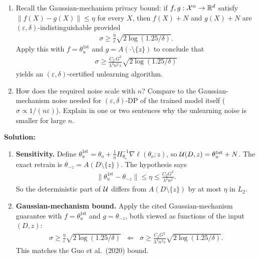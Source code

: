 \documentclass[12pt]{article}
\begin{document}
\begin{enumerate}
\begin{enumerate}
    \item Recall the Gaussian-mechanism privacy bound: if $f, g : {\cal X}^n \to \mathbb{R}^d$ satisfy $\|f(X) - g(X)\| \le \eta$ for every $X$, then $f(X) + N$ and $g(X) + N$ are $(\varepsilon, \delta)$-indistinguishable provided
    \begin{align*}
        \sigma \ge \frac{\eta}{\varepsilon}\sqrt{2\log(1.25/\delta)}.
    \end{align*}
    Apply this with $f = \theta_u^{\mathrm{1st}}$ and $g = A(\cdot \setminus \{z\})$ to conclude that
    \begin{align*}
        \sigma \ge \frac{C_2\, G^2}{\lambda^2 n^2\, \varepsilon}\sqrt{2\log(1.25/\delta)}
    \end{align*}
    yields an $(\varepsilon, \delta)$-certified unlearning algorithm.

    \item How does the required noise scale with $n$? Compare to the Gaussian-mechanism noise needed for $(\varepsilon, \delta)$-DP of the trained model itself ($\sigma \propto 1/(n\varepsilon)$). Explain in one or two sentences why the unlearning noise is smaller for large $n$.
\end{enumerate}

\begin{solution}
{\bf Solution:}\\
\begin{enumerate}
    \item \textbf{Sensitivity.} Define $\theta_u^{\mathrm{1st}} = \theta_o + \frac{1}{n}H_{\theta_o}^{-1}\nabla\ell(\theta_o; z)$, so ${\cal U}(D, z) = \theta_u^{\mathrm{1st}} + N$. The exact retrain is $\theta_{-z} = A(D \setminus \{z\})$. The hypothesis says
    \begin{align*}
        \|\theta_u^{\mathrm{1st}} - \theta_{-z}\| \le \eta \le \frac{C_2 G^2}{\lambda^2 n^2}.
    \end{align*}
    So the deterministic part of ${\cal U}$ differs from $A(D \setminus \{z\})$ by at most $\eta$ in $L_2$.

    \item \textbf{Gaussian-mechanism bound.} Apply the cited Gaussian-mechanism guarantee with $f = \theta_u^{\mathrm{1st}}$ and $g = \theta_{-z}$, both viewed as functions of the input $(D, z)$:
    \begin{align*}
        \sigma \ge \frac{\eta}{\varepsilon}\sqrt{2\log(1.25/\delta)} \;\;\Longleftarrow\;\; \sigma \ge \frac{C_2 G^2}{\lambda^2 n^2 \varepsilon}\sqrt{2\log(1.25/\delta)}.
    \end{align*}
    This matches the Guo et al.\ (2020) bound.


\end{enumerate}
\end{solution}
\end{enumerate}
\end{document}
